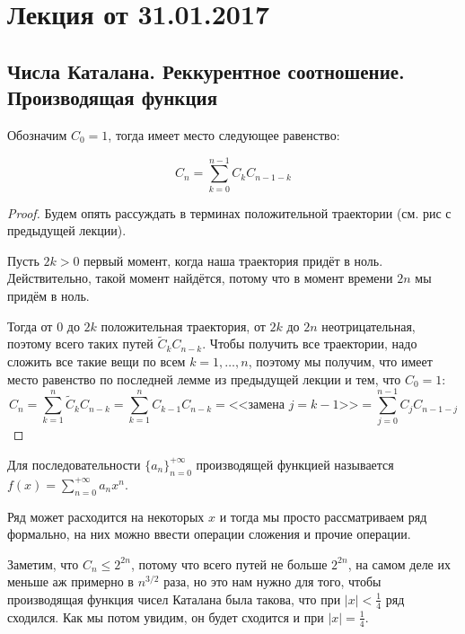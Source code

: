 \section{Лекция от 31.01.2017}

\subsection{Числа Каталана. Реккурентное соотношение. Производящая функция}
\begin{lemma}
  Обозначим $C_0 = 1$, тогда имеет место следующее равенство:

  \[
    C_n = \sum\limits_{k = 0}^{n - 1} C_k C_{n - 1 - k}
  \]
\end{lemma}

\begin{proof}
  Будем опять рассуждать в терминах положительной траектории (см. рис с предыдущей
  лекции).

  Пусть $2k > 0$ первый момент, когда наша траектория придёт в ноль. Действительно,
  такой момент найдётся, потому что в момент времени $2n$ мы придём в ноль.

  Тогда от $0$ до $2k$ положительная траектория, от $2k$ до $2n$ неотрицательная,
  поэтому всего таких путей $\tilde{C}_{k}C_{n - k}$. Чтобы получить все траектории,
  надо сложить все такие вещи по всем $k = 1, \ldots, n$, поэтому мы получим,
  что имеет место равенство по последней лемме из предыдущей лекции и тем, что $C_0 = 1$:
  \[
    C_n = \sum\limits_{k = 1}^n \tilde{C}_{k}C_{n - k} =
    \sum\limits_{k = 1}^n C_{k - 1}C_{n - k} = \text{<<замена $j = k - 1$>>} =
    \sum\limits_{j = 0}^{n - 1} C_j C_{n - 1 - j}
  \]
\end{proof}

\begin{definition}
  Для последовательности $\{a_n\}_{n = 0}^{+\infty}$ производящей функцией называется $f(x) = \sum\limits_{n = 0}^{+\infty} a_n x^n$.
\end{definition}

Ряд может расходится на некоторых $x$ и тогда мы просто
рассматриваем ряд формально, на них можно ввести операции сложения
и прочие операции.

Заметим, что $C_n \leq 2^{2n}$, 
потому что всего путей не больше $2^{2n}$, на самом деле их меньше
аж примерно в $n^{3/2}$ раза, но это нам нужно для того, чтобы 
производящая функция чисел Каталана была такова, что при 
$|x| < \frac{1}{4}$ ряд сходился. Как мы потом увидим, он будет 
сходится и при $|x| = \frac{1}{4}$.

